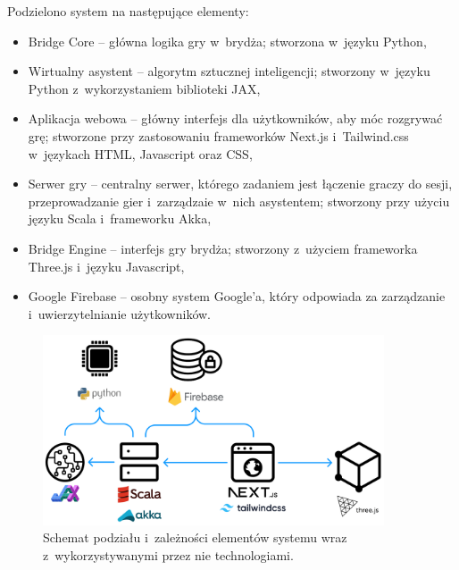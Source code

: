 Podzielono system na następujące elementy:
\begin{itemize}
  \item Bridge Core -- główna logika gry w~brydża; stworzona
        w~języku Python,

  \item Wirtualny asystent -- algorytm sztucznej inteligencji; stworzony
        w~języku Python z~wykorzystaniem biblioteki JAX,

  \item Aplikacja webowa -- główny interfejs dla użytkowników,
        aby móc rozgrywać grę; stworzone przy zastosowaniu
        frameworków Next.js i~Tailwind.css w~językach HTML, \mbox{Javascript}
        oraz CSS,

  \item Serwer gry -- centralny serwer, którego zadaniem jest
        łączenie graczy do sesji, przeprowadzanie gier i~zarządzaie
        w~nich asystentem; stworzony przy użyciu języku Scala
        \mbox{i~frameworku} Akka,

  \item Bridge Engine -- interfejs gry brydża; stworzony
        z~użyciem frameworka Three.js i~języku Javascript,

  \item Google Firebase -- osobny system Google'a, który
        odpowiada za zarządzanie i~uwierzytelnianie użytkowników.
\end{itemize}

\begin{figure}[h!]
  \centering
  \includegraphics[width=0.9\textwidth]{img/schematy/schemat_systemu.png}
  \caption{Schemat podziału i~zależności elementów systemu wraz z~wykorzystywanymi przez nie technologiami.}
  \label{fig:system-scheme}
\end{figure}

\FloatBarrier


